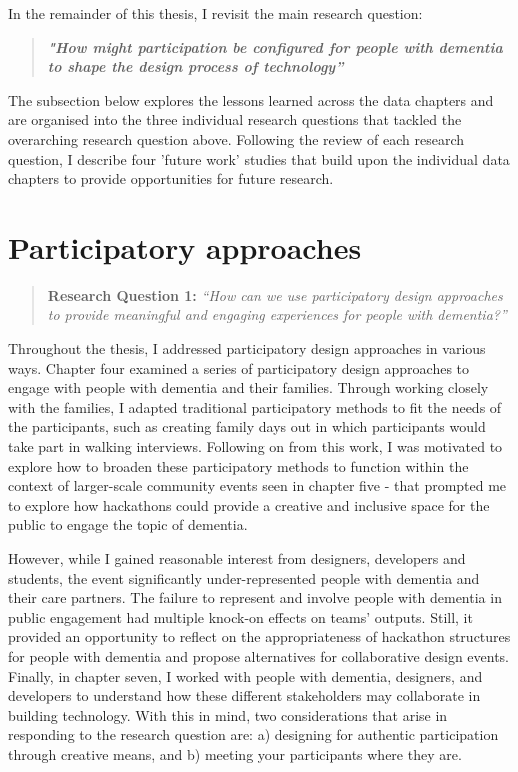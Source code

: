 In the remainder of this thesis, I revisit the main research question:
\begin{quote}
\textbf{\textit{"How might participation be configured for people with dementia to shape the design process of technology”}}
\end{quote}
The subsection below explores the lessons learned across the data chapters and are organised into the three individual research questions that tackled the overarching research question above. Following the review of each research question, I describe four 'future work' studies that build upon the individual data chapters to provide opportunities for future research.
\section{Participatory approaches}
\label{Discussion:RQ1}
\begin{quote}
\textbf{    Research Question 1:
}    
\textit{    “How can we use participatory design approaches to provide meaningful and engaging experiences for people with dementia?”}
\end{quote}

Throughout the thesis, I addressed participatory design approaches in various ways. Chapter four examined a series of participatory design approaches to engage with people with dementia and their families. Through working closely with the families, I adapted traditional participatory methods to fit the needs of the participants, such as creating family days out in which participants would take part in walking interviews. Following on from this work, I was motivated to explore how to broaden these participatory methods to function within the context of larger-scale community events seen in chapter five - that prompted me to explore how hackathons could provide a creative and inclusive space for the public to engage the topic of dementia. 

However, while I gained reasonable interest from designers, developers and students, the event significantly under-represented people with dementia and their care partners. The failure to represent and involve people with dementia in public engagement had multiple knock-on effects on teams' outputs. Still, it provided an opportunity to reflect on the appropriateness of hackathon structures for people with dementia and propose alternatives for collaborative design events. Finally, in chapter seven, I worked with people with dementia, designers, and developers to understand how these different stakeholders may collaborate in building technology. With this in mind, two considerations that arise in responding to the research question are: a) designing for authentic participation through creative means, and b) meeting your participants where they are.


